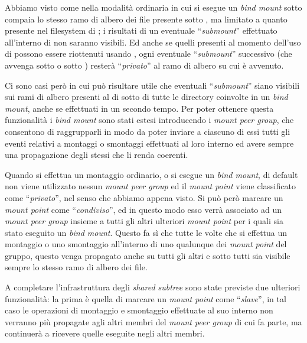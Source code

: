 
Abbiamo visto come nella modalità ordinaria in cui si esegue un
\textit{bind mount} sotto  compaia lo stesso ramo di albero dei
file presente sotto , ma limitato a quanto presente nel
filesystem di ; i risultati di un eventuale
``\textit{submount}'' effettuato all'interno di  non saranno
visibili. Ed anche se quelli presenti al momento dell'uso di 
possono essere riottenuti usando , ogni eventuale
``\textit{submount}'' successivo (che avvenga sotto  o sotto
) resterà ``\textsl{privato}'' al ramo di albero su cui è
avvenuto.


Ci sono casi però in cui può risultare utile che eventuali
``\textit{submount}'' siano visibili sui rami di albero presenti al di sotto
di tutte le directory coinvolte in un \textit{bind mount}, anche se effettuati
in un secondo tempo. Per poter ottenere questa funzionalità i
\textit{bind mount} sono stati estesi introducendo i \textit{mount peer
  group}, che consentono di raggrupparli in modo da poter inviare a ciascuno
di essi tutti gli eventi relativi a montaggi o smontaggi effettuati al loro
interno ed avere sempre una propagazione degli stessi che li renda coerenti.

Quando si effettua un montaggio ordinario, o si esegue un \textit{bind mount},
di default non viene utilizzato nessun \textit{mount peer group} ed il
\textit{mount point} viene classificato come ``\textsl{privato}'', nel senso
che abbiamo appena visto.  Si può però marcare un \textit{mount point} come
``\textsl{condiviso}'', ed in questo modo esso verrà associato ad un
\textit{mount peer group} insieme a tutti gli altri ulteriori \textit{mount
  point} per i quali sia stato eseguito un \textit{bind mount}. Questo fa sì
che tutte le volte che si effettua un montaggio o uno smontaggio all'interno
di uno qualunque dei \textit{mount point} del gruppo, questo venga propagato
anche su tutti gli altri e sotto tutti sia visibile sempre lo stesso ramo di
albero dei file.

A completare l'infrastruttura degli \textit{shared subtree} sono state
previste due ulteriori funzionalità: la prima è quella di marcare un
\textit{mount point} come ``\textit{slave}'', in tal caso le operazioni di
montaggio e smontaggio effettuate al suo interno non verranno più propagate
agli altri membri del \textit{mount peer group} di cui fa parte, ma continuerà
a ricevere quelle eseguite negli altri membri.

